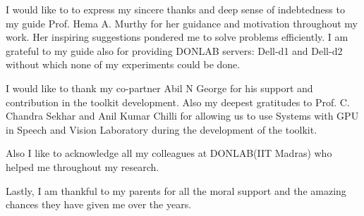 \acknowledgements
I would like to to express my sincere thanks and deep sense of indebtedness to my guide Prof. Hema A. Murthy for her guidance and motivation throughout my work. Her inspiring suggestions pondered me to solve problems efficiently. I am grateful to my guide also for providing DONLAB servers: Dell-d1 and Dell-d2  without which none of my experiments could be done.

\par I would like to thank my co-partner Abil N George for his support and contribution in the toolkit development. Also my deepest gratitudes to Prof. C. Chandra Sekhar and Anil Kumar Chilli for allowing us to use Systems with GPU in Speech and Vision Laboratory during the development of the toolkit. 

\par Also I like to acknowledge all my colleagues at DONLAB(IIT Madras) who helped me throughout my research. 
 
\par Lastly, I am thankful to my parents for all the moral support and the amazing chances they have given me over the years.


